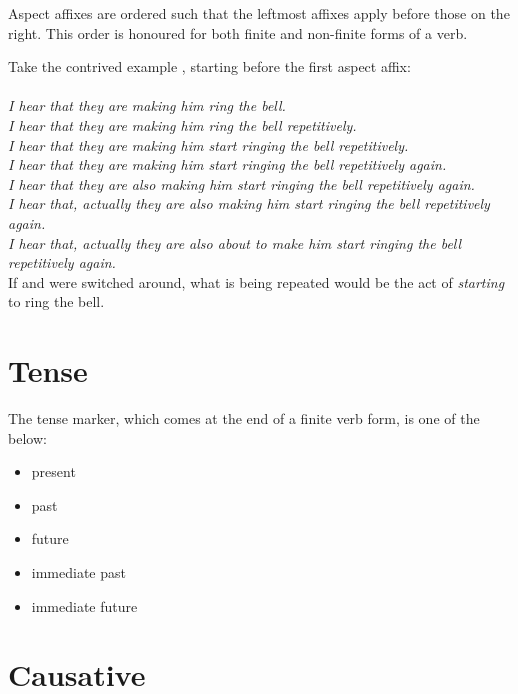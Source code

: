 \documentclass{book}
\begin{document}
Aspect affixes are ordered such that the leftmost affixes apply before those on the right. This order is honoured for both finite and non-finite forms of a verb.

Take the contrived example , starting before the first aspect affix: \\
~\\
 \emph{I hear that they are making him ring the bell.} \\
 \emph{I hear that they are making him ring the bell repetitively.} \\
 \emph{I hear that they are making him start ringing the bell repetitively.} \\
 \emph{I hear that they are making him start ringing the bell repetitively again.} \\
 \emph{I hear that they are also making him start ringing the bell repetitively again.} \\
 \emph{I hear that, actually they are also making him start ringing the bell repetitively again.} \\
 \emph{I hear that, actually they are also about to make him start ringing the bell repetitively again.} \\

If  and  were switched around, what is being repeated would be the act of \emph{starting} to ring the bell.

\section{Tense}

The tense marker, which comes at the end of a finite verb form, is one of the below:

\begin{itemize}
    \item {} present
    \item {} past
    \item {} future
    \item {} immediate past
    \item {} immediate future
\end{itemize}

\section{Causative}
\end{document}
